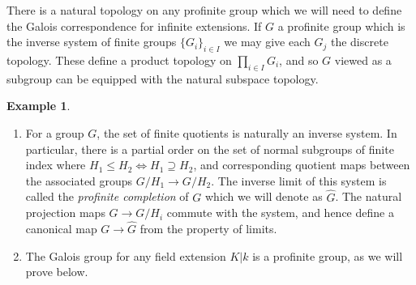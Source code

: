 \documentclass{article}
\theoremstyle{definition}
\newtheorem{example}[theorem]{Example}
\theoremstyle{remark}
\begin{document}
	There is a natural topology on any profinite group which we will need to define the Galois correspondence for infinite extensions.
	If $G$ a profinite group which is the inverse system of finite groups $\{G_i\}_{i \in I}$ we may give each $G_j$ the discrete topology.
	These define a product topology on $\prod_{i \in I} G_i$, and so $G$ viewed as a subgroup can be equipped with the natural subspace topology.
	
\begin{example} \text{}
\begin{enumerate}
	\item For a group $G$, the set of finite quotients is naturally an inverse system.
		In particular, there is a partial order on the set of normal subgroups of finite index where $H_1 \leq H_2 \Longleftrightarrow H_1 \supseteq H_2$, and corresponding quotient maps between the associated groups $G/H_1 \to G/H_2$.
		The inverse limit of this system is called the \textit{profinite completion} of $G$ which we will denote as $\widehat{G}$.	
		The natural projection maps $G \to G/H_i$ commute with the system, and hence define a canonical map $G \to \widehat{G}$ from the property of limits.
	\item The Galois group for any field extension $K|k$ is a profinite group, as we will prove below.
		\end{enumerate}
\end{example}
\end{document}
